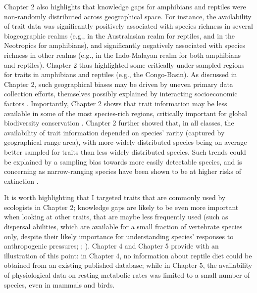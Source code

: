Chapter 2 also highlights that knowledge gaps for amphibians and reptiles were non-randomly distributed across geographical space. For instance, the availability of trait data was significantly positively associated with species richness in several biogeographic realms (e.g., in the Australasian realm for reptiles, and in the Neotropics for amphibians), and significantly negatively associated with species richness in other realms (e.g., in the Indo-Malayan realm for both amphibians and reptiles). Chapter 2 thus highlighted some critically under-sampled regions for traits in amphibians and reptiles (e.g., the Congo-Basin). As discussed in Chapter 2, such geographical biases may be driven by uneven primary data collection efforts, themselves possibly explained by interacting socioeconomic factors \citep{Collen2008, Martin2012, Hortal2015, ONU2015}. Importantly, Chapter 2 shows that trait information may be less available in some of the most species-rich regions, critically important for global biodiversity conservation \citep{Barlow2018}. Chapter 2 further showed that, in all classes, the availability of trait information depended on species' rarity (captured by geographical range area), with more-widely distributed species being on average better sampled for traits than less widely distributed species. Such trends could be explained by a sampling bias towards more easily detectable species, and is concerning as narrow-ranging species have been shown to be at higher risks of extinction \citep{Chichorro2019}. 

It is worth highlighting that I targeted traits that are commonly used by ecologists in Chapter 2; knowledge gaps are likely to be even more important when looking at other traits, that are maybe less frequently used (such as dispersal abilities, which are available for a small fraction of vertebrate species only, despite their likely importance for understanding species' responses to anthropogenic pressures; \citet{Schloss2012}; \citet{Lenoir2015}). Chapter 4 and Chapter 5 provide with an illustration of this point: in Chapter 4, no information about reptile diet could be obtained from an existing published database; while in Chapter 5, the availability of physiological data on resting metabolic rates was limited to a small number of species, even in mammals and birds. %

